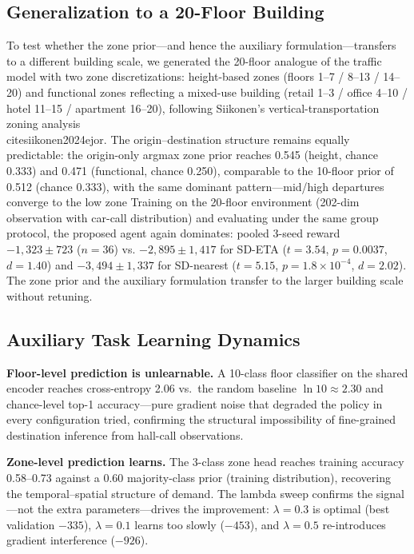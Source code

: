\documentclass[conference]{IEEEtran}
\begin{document}
\subsection{Generalization to a 20-Floor Building}

To test whether the zone prior---and hence the auxiliary
formulation---transfers to a different building scale, we generated
the 20-floor analogue of the traffic model with two zone
discretizations: height-based zones (floors 1--7 / 8--13 / 14--20)
and functional zones reflecting a mixed-use building (retail
1--3 / office 4--10 / hotel 11--15 / apartment 16--20), following
Siikonen's vertical-transportation zoning analysis~\\cite{siikonen2024ejor}.
The origin--destination structure remains equally predictable:
the origin-only argmax zone prior reaches 0.545 (height, chance
0.333) and 0.471 (functional, chance 0.250), comparable to the
10-floor prior of 0.512 (chance 0.333), with the same dominant
pattern---mid/high departures converge to the low zone
Training on the 20-floor
environment (202-dim observation with car-call distribution) and
evaluating under the same group protocol, the proposed agent again
dominates: pooled 3-seed reward $-1{,}323 \pm 723$ ($n = 36$) vs.
$-2{,}895 \pm 1{,}417$ for SD-ETA ($t = 3.54$, $p = 0.0037$,
$d = 1.40$) and $-3{,}494 \pm 1{,}337$ for SD-nearest ($t = 5.15$,
$p = 1.8\times10^{-4}$, $d = 2.02$). The zone prior and the
auxiliary formulation transfer to the larger building scale without
retuning.
\subsection{Auxiliary Task Learning Dynamics}

\textbf{Floor-level prediction is unlearnable.} A 10-class floor
classifier on the shared encoder reaches cross-entropy 2.06 vs.~the
random baseline $\ln 10 \approx 2.30$ and chance-level top-1
accuracy---pure gradient noise that degraded the policy in every
configuration tried, confirming the structural impossibility of
fine-grained destination inference from hall-call observations.

\textbf{Zone-level prediction learns.} The 3-class zone head
reaches training accuracy 0.58--0.73 against a 0.60
majority-class prior (training distribution), recovering the
temporal--spatial structure of demand. The lambda sweep confirms the signal---not the extra
parameters---drives the improvement: $\lambda = 0.3$ is optimal
(best validation $-335$), $\lambda = 0.1$ learns too slowly
($-453$), and $\lambda = 0.5$ re-introduces gradient interference
($-926$).
\end{document}
